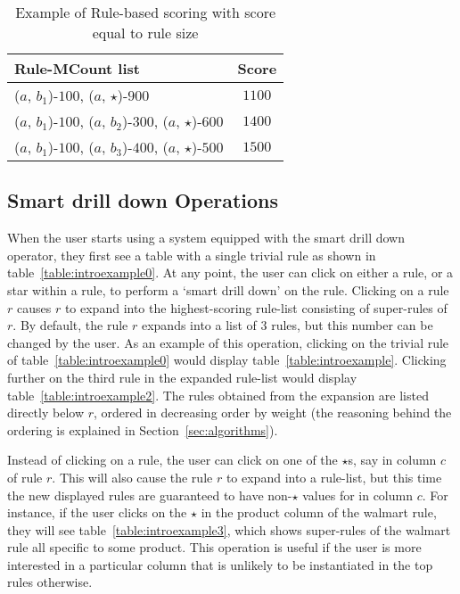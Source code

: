 \begin{table}
\centering
\scriptsize
\begin{tabular}{ | l | c | }
 \hline Rule-MCount list & Score \\ \hline
  ($a$, $b_1$)-$100$, ($a$, $\star$)-$900$ & $1100$ \\
  ($a$, $b_1$)-$100$, ($a$, $b_2$)-$300$, ($a$, $\star$)-$600$ & $1400$  \\
  ($a$, $b_1$)-$100$, ($a$, $b_3$)-$400$, ($a$, $\star$)-$500$ & $1500$ \\ \hline
\end{tabular}
\vspace{-10pt}
\caption{Example of Rule-based scoring with score equal to rule size \label{table:sizescoringexample}}
\vspace{-15pt}
\end{table}

\subsection{Smart drill down Operations}
\label{sec:interface}
When the user starts using a system equipped with
the smart drill down operator, they first see a table with a single trivial rule as shown in table~\ref{table:introexample0}. At any point, the user can click on either a rule, or a star within a rule, to perform a `smart drill down' on the rule. Clicking on a rule $r$ causes $r$ to expand into the highest-scoring rule-list consisting of super-rules of $r$. By default, the rule $r$ expands into a list of $3$ rules, but this number can be changed by the user. As an example of this operation, clicking on the trivial rule of table~\ref{table:introexample0} would display table~\ref{table:introexample}. Clicking further on the third rule in the expanded rule-list would display table~\ref{table:introexample2}. The rules obtained from the expansion are listed directly below $r$, ordered in decreasing order by weight (the reasoning behind the ordering is explained in Section~\ref{sec:algorithms}).

Instead of clicking on a rule, the user can click on one of the $\star$s, say in column $c$ of rule $r$. This will also cause the rule $r$ to expand into a rule-list, but this time the new displayed rules are guaranteed to have non-$\star$ values for in column $c$. For instance, if the user clicks on the $\star$ in the product column of the walmart rule, they will see table~\ref{table:introexample3}, which shows super-rules of the walmart rule all specific to some product. This operation is useful if the user is more interested in a particular column that is unlikely to be instantiated in the top rules otherwise. 

